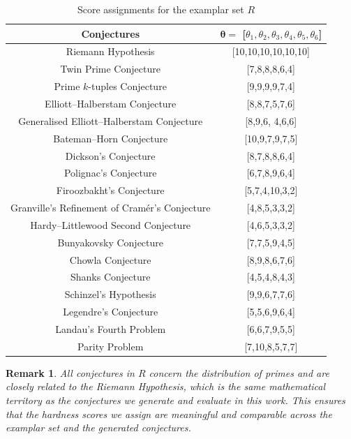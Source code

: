 \documentclass[11pt,reqno]{amsart}
\theoremstyle{plain}\newtheorem{theorem}{Theorem}[section]
\newtheorem{remark}{Remark}[section]
\numberwithin{equation}{section}
\begin{document}
\medskip
\begin{table}[ht]   
\begin{center}
\begin{tabular}{|c|c|}
\hline
Conjectures &  $\bm{\theta}=$ [$\theta_1,\theta_2,\theta_3,\theta_4,\theta_5,\theta_6$]\\
\hline
Riemann Hypothesis & [10,10,10,10,10,10]\\
\hline
Twin Prime Conjecture & [7,8,8,8,6,4]\\
\hline
Prime $k$-tuples Conjecture & [9,9,9,9,7,4]\\
\hline
Elliott–Halberstam Conjecture & [8,8,7,5,7,6]\\
\hline
Generalised Elliott–Halberstam Conjecture & [8,9,6, 4,6,6]\\
\hline
Bateman–Horn Conjecture & [10,9,7,9,7,5]\\
\hline
Dickson's Conjecture & [8,7,8,8,6,4]\\
\hline
Polignac's Conjecture & [6,7,8,9,6,4]\\
\hline
Firoozbakht's Conjecture & [5,7,4,10,3,2]\\
\hline
Granville's Refinement of Cram\'{e}r's Conjecture & [4,8,5,3,3,2]\\
\hline
Hardy–Littlewood Second Conjecture & [4,6,5,3,3,2]\\
\hline
Bunyakovsky Conjecture & [7,7,5,9,4,5]\\
\hline
Chowla Conjecture & [8,9,8,6,7,6]\\
\hline
Shanks Conjecture & [4,5,4,8,4,3]\\
\hline
Schinzel's Hypothesis & [9,9,6,7,7,6]\\
\hline
Legendre's Conjecture & [5,5,6,9,6,4]\\
\hline
Landau's Fourth Problem & [6,6,7,9,5,5]\\
\hline
Parity Problem & [7,10,8,5,7,7]\\
\hline
\end{tabular} 
\end{center}
\caption{Score assignments for the examplar set $R$}
\label{knownconjectures}
\end{table}

\begin{remark}
All conjectures in $R$ concern the distribution of primes and are closely related to the Riemann Hypothesis, which is the same mathematical territory as the conjectures we generate and evaluate in this work. This ensures that the hardness scores we assign are meaningful and comparable across the examplar set and the generated conjectures.    
\end{remark}
\end{document}
